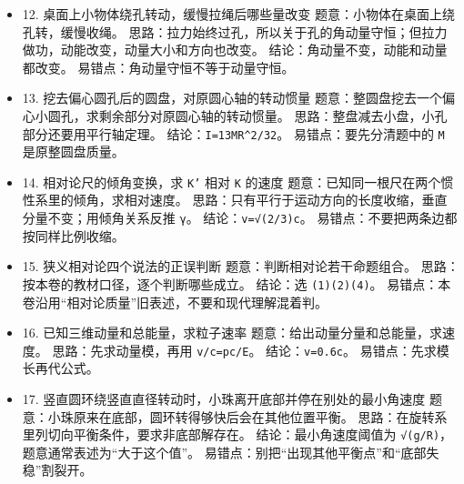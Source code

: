 \documentclass[12pt,a4paper]{ctexart}
\begin{document}
\begin{itemize}

\item 12. 桌面上小物体绕孔转动，缓慢拉绳后哪些量改变 题意：小物体在桌面上绕孔转，缓慢收绳。 思路：拉力始终过孔，所以关于孔的角动量守恒；但拉力做功，动能改变，动量大小和方向也改变。 结论：角动量不变，动能和动量都改变。 易错点：角动量守恒不等于动量守恒。

\end{itemize}

\begin{itemize}

\item 13. 挖去偏心圆孔后的圆盘，对原圆心轴的转动惯量 题意：整圆盘挖去一个偏心小圆孔，求剩余部分对原圆心轴的转动惯量。 思路：整盘减去小盘，小孔部分还要用平行轴定理。 结论：\texttt{I=13MR\textasciicircum{}2/32}。 易错点：要先分清题中的 \texttt{M} 是原整圆盘质量。

\end{itemize}

\begin{itemize}

\item 14. 相对论尺的倾角变换，求 \texttt{K'} 相对 \texttt{K} 的速度 题意：已知同一根尺在两个惯性系里的倾角，求相对速度。 思路：只有平行于运动方向的长度收缩，垂直分量不变；用倾角关系反推 \texttt{γ}。 结论：\texttt{v=√(2/3)c}。 易错点：不要把两条边都按同样比例收缩。

\end{itemize}

\begin{itemize}

\item 15. 狭义相对论四个说法的正误判断 题意：判断相对论若干命题组合。 思路：按本卷的教材口径，逐个判断哪些成立。 结论：选 \texttt{(1)(2)(4)}。 易错点：本卷沿用“相对论质量”旧表述，不要和现代理解混着判。

\end{itemize}

\begin{itemize}

\item 16. 已知三维动量和总能量，求粒子速率 题意：给出动量分量和总能量，求速度。 思路：先求动量模，再用 \texttt{v/c=pc/E}。 结论：\texttt{v=0.6c}。 易错点：先求模长再代公式。

\end{itemize}

\begin{itemize}

\item 17. 竖直圆环绕竖直直径转动时，小珠离开底部并停在别处的最小角速度 题意：小珠原来在底部，圆环转得够快后会在其他位置平衡。 思路：在旋转系里列切向平衡条件，要求非底部解存在。 结论：最小角速度阈值为 \texttt{√(g/R)}，题意通常表述为“大于这个值”。 易错点：别把“出现其他平衡点”和“底部失稳”割裂开。

\end{itemize}
\end{document}
